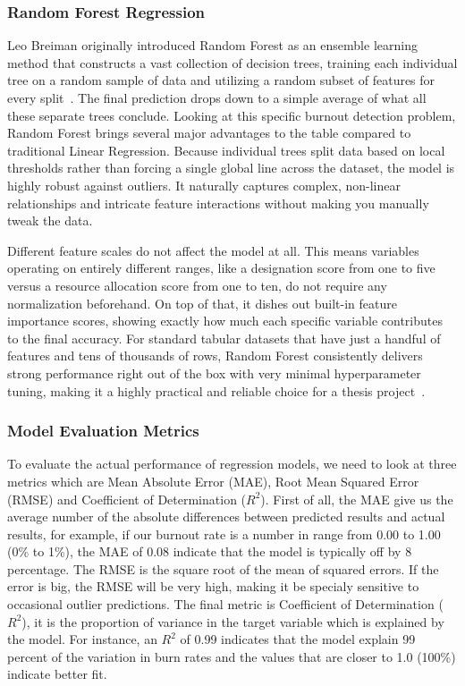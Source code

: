 \documentclass[12pt,a4paper]{article}
\begin{document}
\subsubsection{Random Forest Regression}

Leo Breiman originally introduced Random Forest as an ensemble learning method that constructs a vast collection of decision trees, training each individual tree on a random sample of data and utilizing a random subset of features for every split~\cite{breiman2001}. The final prediction drops down to a simple average of what all these separate trees conclude. Looking at this specific burnout detection problem, Random Forest brings several major advantages to the table compared to traditional Linear Regression. Because individual trees split data based on local thresholds rather than forcing a single global line across the dataset, the model is highly robust against outliers. It naturally captures complex, non-linear relationships and intricate feature interactions without making you manually tweak the data.

Different feature scales do not affect the model at all. This means variables operating on entirely different ranges, like a designation score from one to five versus a resource allocation score from one to ten, do not require any normalization beforehand. On top of that, it dishes out built-in feature importance scores, showing exactly how much each specific variable contributes to the final accuracy. For standard tabular datasets that have just a handful of features and tens of thousands of rows, Random Forest consistently delivers strong performance right out of the box with very minimal hyperparameter tuning, making it a highly practical and reliable choice for a thesis project~\cite{fernandez2014}.

\subsubsection{Model Evaluation Metrics}

To evaluate the actual performance of regression models, we need to look at three metrics which are Mean Absolute Error (MAE), Root Mean Squared Error (RMSE) and Coefficient of Determination ($R^{2}$). First of all, the MAE give us the average number of the absolute differences between predicted results and actual results, for example, if our burnout rate is a number in range from 0.00 to 1.00 (0\% to 1\%), the MAE of 0.08 indicate that the model is typically off by 8 percentage. The RMSE is the square root of the mean of squared errors. If the error is big, the RMSE will be very high, making it be specialy sensitive to occasional outlier predictions. The final metric is Coefficient of Determination ($R^{2}$), it is the proportion of variance in the target variable which is explained by the model. For instance, an $R^{2}$ of 0.99 indicates that the model explain 99 percent of the variation in burn rates and the values that are closer to 1.0 (100\%) indicate better fit.
\end{document}

